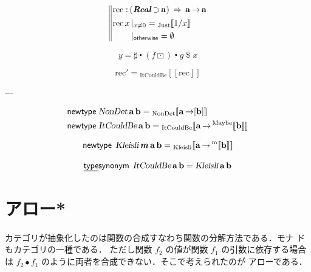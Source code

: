 \documentclass[a5paper,twoside,fleqn,draft]{jsbook}
\def\[{[\![}
\def\]{]\!]}
\newenvironment{leader}{\begingroup\gt}{\endgroup}
\newcommand{\mBrace}{\Vert}
\newcommand{\mKeyword}[1]{\mathsf{#1}}
\newcommand{\mKeywordUnderline}[1]{\text{\underline{\textsf{#1}}}}
\newcommand{\mNewTypeDeclKeyword}{\mKeyword{newtype}}
\newcommand{\mOtherwiseKeyword}{\mKeyword{otherwise}}
\newcommand{\mTypeSynonymDeclKeyword}{\mKeywordUnderline{type}\mKeyword{synonym}}
\DeclareMathOperator{\mNewTypeDecl}{\mNewTypeDeclKeyword}
\DeclareMathOperator{\mOtherwise}{\mOtherwiseKeyword}
\DeclareMathOperator{\mSuperClass}{\;\Rightarrow\;}
\DeclareMathOperator{\mSuperSet}{\supset}
\DeclareMathOperator{\mTypeSynonymDecl}{\mTypeSynonymDeclKeyword}
\newcommand{\mNothing}{\emptyset}
\DeclareMathOperator{\mApply}{\$}
\DeclareMathOperator{\mCompFunc}{\centerdot}
\DeclareMathOperator{\mCompCat}{\bullet}
\DeclareMathOperator{\mFuncArrow}{\rightarrow}
\DeclareMathOperator{\mIn}{{:\!:}}
\DeclareMathOperator{\mMapMaybe}{\boxdot}
\newcommand{\mType}[1]{\mathbf{#1}} %
\newcommand{\mPolymorphicTypeParameter}[1]{\textbf{\textit{#1}}}
\newcommand{\mA}{\mType{a}}
\newcommand{\mB}{\mType{b}}
\newcommand{\mTypeAssemble}[2]{{}^\mathrm{#1}\[\mType{#2}\]}
\newcommand{\mMaybeType}[1]{\mTypeAssemble{Maybe}{#1}}
\newcommand{\mTypeConstructor}[1]{\textsl{#1}}
\newcommand{\mValueConstructor}[1]{\mathrm{#1}}
\newcommand{\mValueWith}[2]{{}_\mValueConstructor{#1}\[#2\]}
\newcommand{\mJustWith}[1]{\mValueWith{Just}{#1}}
\newcommand{\mTypeClass}[1]{\textbf{\textit{#1}}}
\newcommand{\mRealTypeClass}{\mTypeClass{Real}}
\newcommand{\mGuard}[1]{\mathop{\mid_{#1}}}
\begin{document}
\begin{equation}
  \left\mBrace
  \begin{aligned}
    &\mathrm{rec}
    \mIn{}(\mRealTypeClass\mSuperSet\mA)
    \mSuperClass\mA\mFuncArrow\mA\\
    &
    \begin{aligned}
      \mathop{\mathrm{rec}}x&\mGuard{x\neq0}
      =\mJustWith{1/x}\\
      &\mGuard{\mOtherwise}
      =\mNothing
    \end{aligned}
  \end{aligned}
  \right.
\end{equation}

\begin{equation}
  y
  =\sharp\mCompFunc(f\mMapMaybe)\mCompFunc g\mApply x
\end{equation}

\begin{equation}
  \mathrm{rec}'
  =\mValueWith{ItCouldBe}{\mathrm{rec}}
\end{equation}

---

\begin{align}
  \mNewTypeDecl\;
  &\mTypeConstructor{NonDet}\,\mA\,\mB
  =\mValueWith{NonDet}{\mA\mFuncArrow[\mB]}\\
  \mNewTypeDecl\;
  &\mTypeConstructor{ItCouldBe}\,\mA\,\mB
  =\mValueWith{ItCouldBe}{\mA\mFuncArrow\mMaybeType{b}}
\end{align}

\begin{equation}
  \mNewTypeDecl\;
  \mTypeConstructor{Kleisli}\,\mPolymorphicTypeParameter{m}\,\mA\,\mB
  =\mValueWith{Kleisli}{\mA\mFuncArrow\mTypeAssemble{m}{\mB}}
\end{equation}

\begin{equation}
  \mTypeSynonymDecl\;
  \mTypeConstructor{ItCouldBe}\,\mA\,\mB
  =\mTypeConstructor{Kleisli}\,\mA\,\mB
\end{equation}

\chapter{アロー*}
\label{ch:arrow}

\begin{leader}
  カテゴリが抽象化したのは関数の合成すなわち関数の分解方法である．モナ
  ドもカテゴリの一種である．%
  ただし関数 $f_2$ の値が関数 $f_1$ の引数に依存する場合は
  $f_2\mCompCat f_1$ のように両者を合成できない．そこで考えられたのが
  アローである．
\end{leader}
\end{document}
